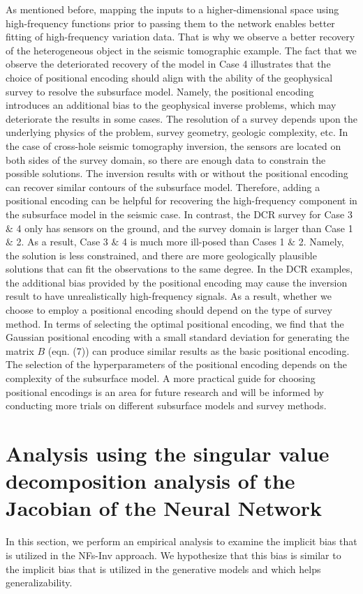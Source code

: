 \documentclass[lettersize,journal]{IEEEtran}
\begin{document}
As mentioned before, mapping the inputs to a higher-dimensional space using high-frequency functions prior to passing them to the network enables better fitting of high-frequency variation data. That is why we observe a better recovery of the heterogeneous object in the seismic tomographic example. The fact that we observe the deteriorated recovery of the model in Case 4 illustrates that the choice of positional encoding should align with the ability of the geophysical survey to resolve the subsurface model. Namely, the positional encoding introduces an additional bias to the geophysical inverse problems, which may deteriorate the results in some cases. The resolution of a survey depends upon the underlying physics of the problem, survey geometry, geologic complexity, etc. In the case of cross-hole seismic tomography inversion, the sensors are located on both sides of the survey domain, so there are enough data to constrain the possible solutions. The inversion results with or without the positional encoding can recover similar contours of the subsurface model. Therefore, adding a positional encoding can be helpful for recovering the high-frequency component in the subsurface model in the seismic case. In contrast, the DCR survey for Case 3 $\&$ 4 only has sensors on the ground, and the survey domain is larger than Case 1 $\&$ 2. As a result, Case 3 $\&$ 4 is much more ill-posed than Cases 1 $\&$ 2. Namely, the solution is less constrained, and there are more geologically plausible solutions that can fit the observations to the same degree. In the DCR examples, the additional bias provided by the positional encoding may cause the inversion result to have unrealistically high-frequency signals. As a result, whether we choose to employ a positional encoding should depend on the type of survey method. In terms of selecting the optimal positional encoding, we find that the Gaussian positional encoding with a small standard deviation for generating the matrix $B$ (eqn. (7)) can produce similar results as the basic positional encoding. The selection of the hyperparameters of the positional encoding depends on the complexity of the subsurface model. A more practical guide for choosing positional encodings is an area for future research and will be informed by conducting more trials on different subsurface models and survey methods. 

\section{Analysis using the singular value decomposition analysis of the Jacobian of the Neural Network}
\label{sec:5}
In this section, we perform an empirical analysis to examine the implicit bias that is utilized in the NFs-Inv approach. We hypothesize that this bias is similar to the implicit bias that is utilized in the generative models and which helps generalizability.
\end{document}
